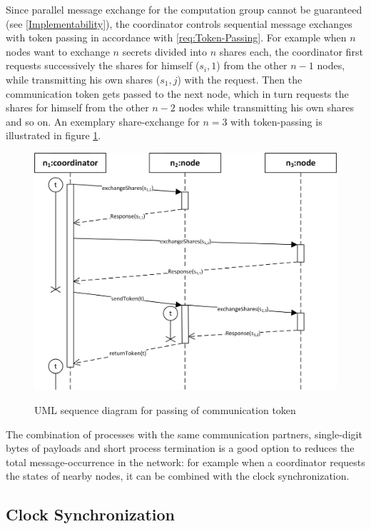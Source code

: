 		Since parallel message exchange for the computation group cannot be guaranteed (see \ref{Implementability}), the coordinator controls sequential message exchanges with token passing in accordance with \ref{req:Token-Passing}. For example when $n$ nodes want to exchange $n$ secrets divided into $n$ shares each, the coordinator first requests successively the shares for himself ($s_i,1$) from the other $n-1$ nodes, while transmitting his own shares ($s_1,j$) with the request. Then the communication token gets passed to the next node, which in turn requests the shares for himself from the other $n-2$ nodes while transmitting his own shares and so on. An exemplary share-exchange for $n=3$ with token-passing is illustrated in figure \ref{figure:coordinator token passing}.
		
		\begin{figure}[!htb] %
		\caption{\gls{UML} sequence diagram for passing of communication token}
		\includegraphics[scale=1.0]{figures/token-passing.png}
		\label{figure:coordinator token passing}
		\end{figure}
		
		The combination of processes with the same communication partners, single-digit bytes of payloads and short process termination is a good option to reduces the total message-occurrence in the network: for example when a coordinator requests the states of nearby nodes, it can be combined with the clock synchronization.
		
		\FloatBarrier
		
		\subsection{Clock Synchronization}
		\label{Clock synchronization}
		
